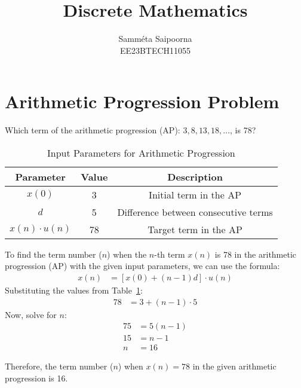 \documentclass{article}
\title{Discrete Mathematics}
\author{Samméta Saipoorna\\
        EE23BTECH11055}
\begin{document}
\maketitle

\section{Arithmetic Progression Problem}
Which term of the arithmetic progression (AP): $3, 8, 13, 18, \ldots$, is 78?

\begin{table}[h]
    \centering
    \begin{tabular}{|c|c|c|}
        \hline
        \textbf{Parameter} & \textbf{Value} & \textbf{Description} \\
        \hline
        $x(0)$ & 3 & Initial term in the AP \\
        $d$ & 5 & Difference between consecutive terms \\
        $x(n) \cdot u(n)$ & 78 & Target term in the AP \\
        \hline
    \end{tabular}
    \caption{Input Parameters for Arithmetic Progression}
    \label{tab:input_parameters}
\end{table}

To find the term number ($n$) when the $n$-th term $x(n)$ is 78 in the arithmetic progression (AP) with the given input parameters, we can use the formula:
\begin{align*}
 x(n) &= [x(0) + (n-1)d] \cdot u(n)
\end{align*}
Substituting the values from Table~\ref{tab:input_parameters}:
\begin{align*}
 78 &= 3 + (n-1) \cdot 5 \tag{1}
\end{align*}
Now, solve for $n$:
\begin{align*}
75 &= 5(n-1) \\
15 &= n-1 \\
n &= 16
\end{align*}

Therefore, the term number ($n$) when $x(n) = 78$ in the given arithmetic progression is 16.
\end{document}
